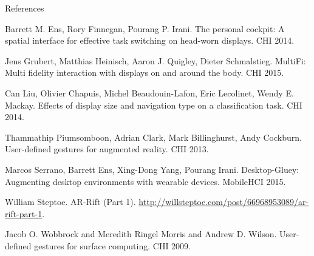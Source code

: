 \begin{frame}[allowframebreaks]{References}
  \begin{thebibliography}{10}
      Barrett M. Ens, Rory Finnegan, Pourang P. Irani.
      \newblock The personal cockpit: A spatial interface for effective task switching on head-worn displays.
      \newblock CHI 2014.

      Jens Grubert, Matthias Heinisch, Aaron J. Quigley, Dieter Schmalstieg.
      \newblock MultiFi: Multi fidelity interaction with displays on and around the body.
      \newblock CHI 2015.

      Can Liu, Olivier Chapuis, Michel Beaudouin-Lafon, Eric Lecolinet, Wendy E. Mackay.
      \newblock Effects of display size and navigation type on a classification task.
      \newblock CHI 2014.

      Thammathip Piumsomboon, Adrian Clark, Mark Billinghurst, Andy Cockburn.
      \newblock User-defined gestures for augmented reality.
      \newblock CHI 2013.

      Marcos Serrano, Barrett Ens, Xing-Dong Yang, Pourang Irani.
      \newblock Desktop-Gluey: Augmenting desktop environments with wearable devices.
      \newblock MobileHCI 2015.

      William Steptoe.
      \newblock AR-Rift (Part 1).
      \newblock \url{http://willsteptoe.com/post/66968953089/ar-rift-part-1}.

      Jacob O. Wobbrock and Meredith Ringel Morris and Andrew D. Wilson.
      \newblock User-defined gestures for surface computing.
      \newblock CHI 2009.
  \end{thebibliography}
\end{frame}